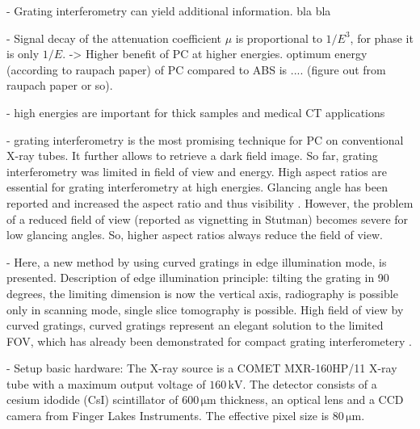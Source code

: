 \documentclass[aps,prl,floatfix,twocolumn,10pt]{revtex4-1}  %
\newcommand{\unit}[1]{\ensuremath{\, \mathrm{#1}}}
\begin{document}



 



- Grating interferometry can yield additional information. bla bla

- Signal decay of the attenuation coefficient $\mu$ is proportional to $1/E^3$, for phase it is only $1/E$. -> Higher benefit of PC at higher energies. optimum energy (according to raupach paper) of PC compared to ABS is .... (figure out from raupach paper or so).

- high energies are important for thick samples and medical CT applications

- grating interferometry is the most promising technique for PC on conventional X-ray tubes. It further allows to retrieve a dark field image. So far, grating interferometry was limited in field of view and energy. High aspect ratios are essential for grating interferometry at high energies. Glancing angle has been reported and increased the aspect ratio and thus visibility \cite{Stutman2012}. However, the problem of a reduced field of view (reported as vignetting in Stutman) becomes severe for low glancing angles. So, higher aspect ratios always reduce the field of view.

- Here, a new method by using curved gratings in edge illumination mode, is presented. Description of edge illumination principle: tilting the grating in 90 degrees, the limiting dimension is now the vertical axis, radiography is possible only in scanning mode, single slice tomography is possible. High field of view by curved gratings, curved gratings represent an elegant solution to the limited FOV, which has already been demonstrated for compact grating interferometery \cite{Thuering2011}.

- Setup basic hardware: The X-ray source is a COMET MXR-160HP/11 X-ray tube with a maximum output voltage of $160 \unit{kV}$. The detector consists of a cesium idodide (CsI) scintillator of $600 \unit{\mu m}$ thickness, an optical lens and a CCD camera from Finger Lakes Instruments. The effective pixel size is $80 \unit{\mu m}$. 
\end{document}
